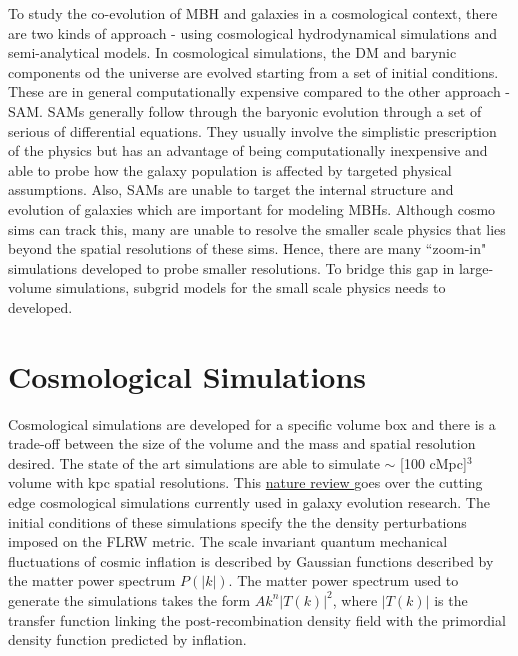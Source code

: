 \documentclass{book}
\begin{document}
To study the co-evolution of MBH and galaxies in a cosmological context, there are two kinds of approach - using cosmological hydrodynamical simulations and semi-analytical models. In cosmological simulations, the DM and barynic components od the universe are evolved starting from a set of initial conditions. These are in general computationally expensive compared to the other approach - SAM. SAMs generally follow through the baryonic evolution through a set of serious of differential equations. They usually involve the simplistic prescription of the physics but has an advantage of being computationally inexpensive and able to probe how the galaxy population is affected by targeted physical assumptions. Also, SAMs are unable to target the internal structure and evolution of galaxies which are important for modeling MBHs. Although cosmo sims can track this, many are unable to resolve the smaller scale physics that lies beyond the spatial resolutions of these sims. Hence, there are many ``zoom-in" simulations developed to probe smaller resolutions. To bridge this gap in large-volume simulations, subgrid models for the small scale physics needs to developed. 


\newpage

\section{Cosmological Simulations}

Cosmological simulations are developed for a specific volume box and there is a trade-off between the size of the volume and the mass and spatial resolution desired. The state of the art simulations are able to simulate $\sim$ [100 cMpc]$^3$ volume with kpc spatial resolutions. This \href{https://www.nature.com/articles/s42254-019-0127-2}{nature review } goes over the cutting edge cosmological simulations currently used in galaxy evolution research. The initial conditions of these simulations specify the the density perturbations imposed on the FLRW metric. The scale invariant quantum mechanical fluctuations of cosmic inflation is described by Gaussian functions described by the matter power spectrum $P(|k|)$. The matter power spectrum used to generate the simulations takes the form $A k^n |T(k)|^2$, where $|T(k)|$ is the transfer function linking the post-recombination density field with the primordial density function predicted by inflation.
\end{document}
